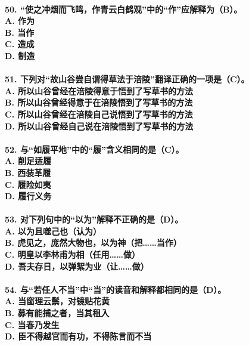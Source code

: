 \documentclass[UTF8]{ctexart} %
\begin{document}
\paragraph{
50. “使之冲烟而飞鸣，作青云白鹤观”中的“作”应解释为（\color{red}B\color{black}）。 \\
    A. 作为 \\
    B. 当作 \\
    C. 造成 \\
    D. 制造
}
\paragraph{
51. 下列对“故山谷尝自谓得草法于涪陵”翻译正确的一项是（\color{red}C\color{black}）。 \\
    A. 所以山谷曾经在涪陵得意于悟到了写草书的方法 \\
    B. 所以山谷曾经得意于在涪陵悟到了写草书的方法 \\
    C. 所以山谷曾经在涪陵自己说悟到了写草书的方法 \\
    D. 所以山谷曾经自己说在涪陵悟到了写草书的方法
}
\paragraph{
52. 与“如履平地”中的“履”含义相同的是（\color{red}C\color{black}）。 \\
    A. 削足适履 \\
    B. 西装革履 \\
    C. 履险如夷 \\
    D. 履行义务
}
\paragraph{
53. 对下列句中的“以为”解释不正确的是（\color{red}D\color{black}）。 \\
    A. 以为且噬己也（认为） \\
    B. 虎见之，庞然大物也，以为神（把……当作） \\
    C. 明皇以李林甫为相（任用……做） \\
    D. 吾夫存日，以弹絮为业（让……做）
}
\paragraph{
54. 与“若任人不当”中“当”的读音和解释都相同的是（\color{red}D\color{black}）。 \\
    A. 当窗理云鬃，对镜贴花黄 \\
    B. 募有能捕之者，当其租入 \\
    C. 当春乃发生 \\
    D. 臣不得越官而有功，不得陈言而不当
}
\end{document}
